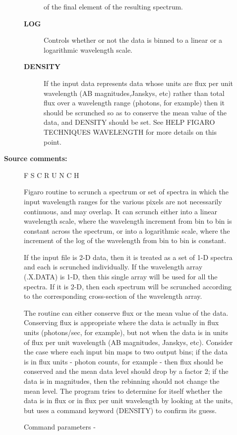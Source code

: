 \begin{description}
\begin{description}
\begin{description}
 of the final element of the resulting spectrum.
\item [\textbf{LOG}]
 Controls whether or not the data is binned to a linear
 or a logarithmic wavelength scale.
\item [\textbf{DENSITY}]
 If the input data represents data whose units are flux per
 unit wavelength (AB magnitudes,Janskys, etc) rather than
 total flux over a wavelength range (photons, for example)
 then it should be scrunched so as to conserve the mean
 value of the data, and DENSITY should be set.  See HELP
 FIGARO TECHNIQUES WAVELENGTH for more details on this point.
\end{description}

\item [\textbf{Source comments:}]
\begin{terminalv}
 F S C R U N C H

 Figaro routine to scrunch a spectrum or set of spectra in which
 the input wavelength ranges for the various pixels are not
 necessarily continuous, and may overlap.  It can scrunch
 either into a linear wavelength scale, where the wavelength
 increment from bin to bin is constant across the spectrum, or
 into a logarithmic scale, where the increment of the log of
 the wavelength from bin to bin is constant.

 If the input file is 2-D data, then it is treated as a set of
 1-D spectra and each is scrunched individually.   If the wavelength
 array (.X.DATA) is 1-D, then this single array will be used for all
 the spectra.  If it is 2-D, then each spectrum will be scrunched
 according to the corresponding cross-section of the wavelength
 array.

 The routine can either conserve flux or the mean value
 of the data.  Conserving flux is appropriate where the data is
 actually in flux units (photons/sec, for example), but not when
 the data is in units of flux per unit wavelength (AB magnitudes,
 Janskys, etc). Consider the case where each input bin maps to two
 output bins; if the data is in flux units - photon counts, for
 example - then flux should be conserved and the mean data level
 should drop by a factor 2; if the data is in magnitudes, then
 the rebinning should not change the mean level.  The program
 tries to determine for itself whether the data is in flux
 or in flux per unit wavelength by looking at the units, but
 uses a command keyword (DENSITY) to confirm its guess.

 Command parameters -


\end{terminalv}
\end{description}
\end{description}
